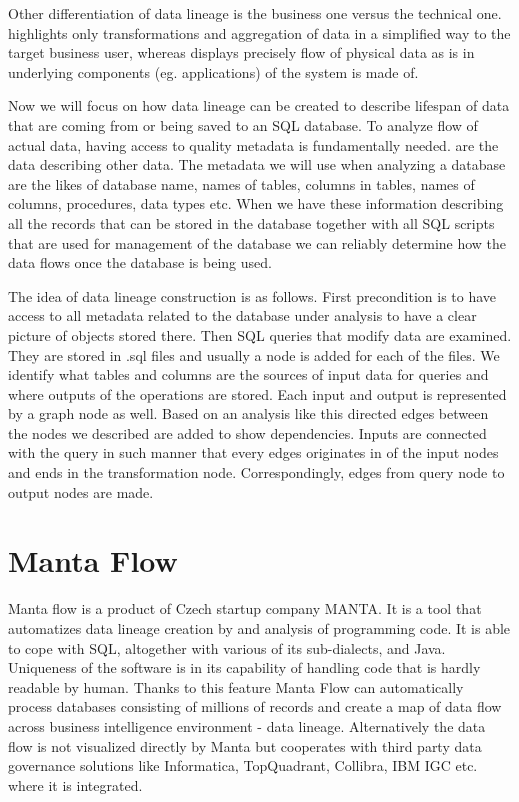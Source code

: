 Other differentiation of data lineage is the business one versus the technical one.
 highlights only transformations and aggregation of data in a simplified way to the target business user, whereas  displays precisely flow of physical data as is in underlying components (eg. applications) of the system is made of.

Now we will focus on how data lineage can be created to describe lifespan of data that are coming from or being saved to an SQL database.
To analyze flow of actual data, having access to quality metadata is fundamentally needed.
 are the data describing other data. The metadata we will use when analyzing a database are the likes of database name, names of tables, columns in tables, names of columns, procedures, data types etc.
When we have these information describing all the records that can be stored in the database together with all SQL scripts that are used for management of the database we can reliably determine how the data flows once the database is being used.

The idea of data lineage construction is as follows. First precondition is to have access to all metadata related to the database under analysis to have a clear picture of objects stored there. 
Then SQL queries that modify data are examined. They are stored in .sql files and usually a node is added for each of the files. We identify what tables and columns are the sources of input data for queries and where outputs of the operations are stored. Each input and output is represented by a graph node as well. Based on an analysis like this directed edges between the nodes we described are added to show dependencies. Inputs are connected with the query in such manner that every edges originates in of the input nodes and ends in the transformation node. Correspondingly, edges from query node to output nodes are made.




\section{Manta Flow}

Manta flow is a product of Czech startup company MANTA. It is a tool that automatizes data lineage creation by and analysis of programming code. It is able to cope with SQL, altogether with various of its sub-dialects, and Java. Uniqueness of the software is in its capability of handling code that is hardly readable by human. Thanks to this feature Manta Flow can automatically process databases consisting of millions of records and create a map of data flow across business intelligence environment - data lineage.
Alternatively the data flow is not visualized directly by Manta but cooperates with third party data governance solutions like Informatica, TopQuadrant, Collibra, IBM IGC etc. where it is integrated.

